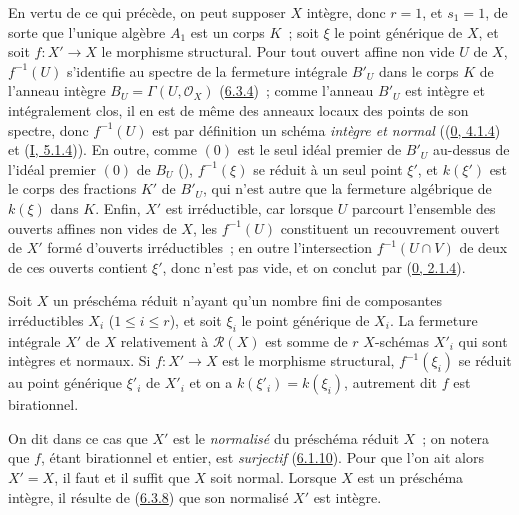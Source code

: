 En vertu de ce qui précède, on peut supposer $X$ intègre, donc $r=1$, et
$s_1=1$, de sorte que l'unique algèbre $A_1$ est un corps $K$~; soit $\xi$ le
point générique de $X$, et soit $f:X'\to X$ le morphisme structural. Pour tout
ouvert affine non vide $U$ de $X$, $f^{-1}(U)$ s'identifie au spectre de la
fermeture intégrale $B'_U$ dans le corps $K$ de l'anneau intègre
$B_U=\Gamma(U,\mathcal{O}_X)$ (\hyperref[II.6.3.4-fr]{6.3.4})~; comme l'anneau
$B'_U$ est intègre et intégralement clos, il en est de même des anneaux locaux
des points de son spectre, donc $f^{-1}(U)$ est par définition un schéma
\emph{intègre et normal} ((\hyperref[0.4.1.4-fr]{0, 4.1.4}) et
(\hyperref[I.5.1.4-fr]{I, 5.1.4})). En outre, comme $(0)$ est le seul idéal
premier de $B'_U$ au-dessus de l'idéal premier $(0)$ de $B_U$
(\cite[t.~I, p.~259]{I-13}), $f^{-1}(\xi)$ se réduit à un seul point $\xi'$,
et $k(\xi')$ est le corps des fractions $K'$ de $B'_U$, qui n'est autre que la
fermeture algébrique de $k(\xi)$ dans $K$. Enfin, $X'$ est irréductible, car
lorsque $U$ parcourt l'ensemble des ouverts affines non vides de $X$, les
$f^{-1}(U)$ constituent un recouvrement ouvert de $X'$ formé d'ouverts
irréductibles~; en outre l'intersection $f^{-1}(U\cap V)$ de deux de ces
ouverts contient $\xi'$, donc n'est pas vide, et on conclut par
(\hyperref[0.2.1.4-fr]{0, 2.1.4}).

\begin{corollary}[6.3.8]
\label{II.6.3.8-fr}
Soit $X$ un préschéma réduit n'ayant qu'un nombre fini de composantes
irréductibles $X_i$ ($1\leq i\leq r$), et soit $\xi_i$ le point générique de
$X_i$. La fermeture intégrale $X'$ de $X$ relativement à $\mathcal{R}(X)$ est
somme de $r$ $X$-schémas $X'_i$ qui sont intègres et normaux. Si $f:X'\to X$
est le morphisme structural, $f^{-1}(\xi_i)$ se réduit au point générique
$\xi'_i$ de $X'_i$ et on a $k(\xi'_i)=k(\xi_i)$, autrement dit $f$ est
birationnel.
\end{corollary}

On dit dans ce cas que $X'$ est le \emph{normalisé} du préschéma réduit $X$~;
on notera que $f$, étant birationnel et entier, est \emph{surjectif}
(\hyperref[II.6.1.10-fr]{6.1.10}). Pour que l'on ait alors $X'=X$, il faut et
il suffit que $X$ soit normal. Lorsque $X$ est un préschéma intègre, il résulte
de (\hyperref[II.6.3.8-fr]{6.3.8}) que son normalisé $X'$ est intègre.

